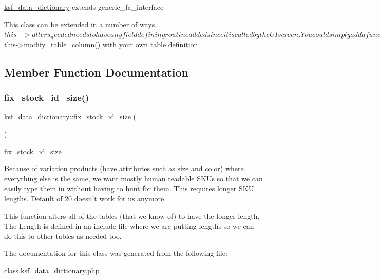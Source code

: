 \hyperlink{classksf__data__dictionary}{ksf\+\_\+data\+\_\+dictionary} extends generic\+\_\+fa\+\_\+interface \begin{DoxyVerb}This class can be extended in a number of ways.
$this->alters_needed needs to have any field defining routine added since
it is called by the UI screen.

You could simply add a function and update alters_needed.

You can extend the class, creating a new function that defines the table.
You would also need to alter the UI class to find the extended class...

You could alter the routine fix_stock_id_size by adding more tables into the
array definition.

You could use this class and call $this->modify_table_column() with your own 
table definition.\end{DoxyVerb}
 

\subsection{Member Function Documentation}
\hypertarget{classksf__data__dictionary_af5a8a952ccf5cf307449559a8c0219b3}{}\label{classksf__data__dictionary_af5a8a952ccf5cf307449559a8c0219b3} 
\subsubsection{\texorpdfstring{fix\+\_\+stock\+\_\+id\+\_\+size()}{fix\_stock\_id\_size()}}
{\footnotesize\ttfamily ksf\+\_\+data\+\_\+dictionary\+::fix\+\_\+stock\+\_\+id\+\_\+size (\begin{DoxyParamCaption}{ }\end{DoxyParamCaption})}

fix\+\_\+stock\+\_\+id\+\_\+size \begin{DoxyVerb}Because of variation products (have attributes such as size and color) where 
everything else is the same, we want mostly human readable SKUs so that we
can easily type them in without having to hunt for them.  This requires longer
SKU lengths.  Default of 20 doesn't work for us anymore.

This function alters all of the tables (that we know of) to have the longer
length.  The Length is defined in an include file where we are putting
lengths so we can do this to other tables as needed too.\end{DoxyVerb}
 

The documentation for this class was generated from the following file\+:\begin{DoxyCompactItemize}
\item 
class.\+ksf\+\_\+data\+\_\+dictionary.\+php\end{DoxyCompactItemize}
